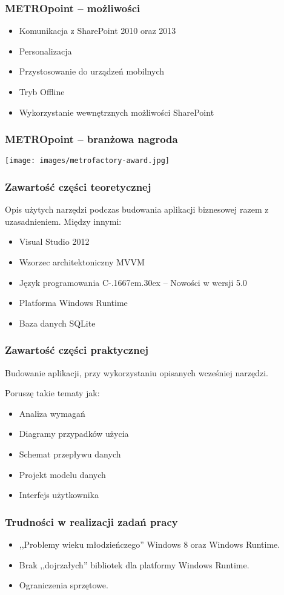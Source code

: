 \documentclass{beamer}
\def\Csharp{%
    C\kern-.1667em\raise.30ex\hbox{\smaller{\#}}%
 }
\begin{document}
\begin{frame}
\frametitle{\textbf{METRO}point -- możliwości}
\begin{itemize}[<+->]
\item Komunikacja z SharePoint 2010 oraz 2013
\item Personalizacja
\item Przystosowanie do urządzeń mobilnych 
\item Tryb Offline
\item Wykorzystanie wewnętrznych możliwości SharePoint
\end{itemize}
\end{frame}


\begin{frame}
\frametitle{\textbf{METRO}point -- branżowa nagroda}
 \texttt{[image: images/metrofactory-award.jpg]}
\end{frame}

\begin{frame}
\frametitle{Zawartość części teoretycznej}
Opis użytych narzędzi podczas budowania aplikacji biznesowej razem z uzasadnieniem.
Między innymi:
\begin{itemize}[<+->]
\item Visual Studio 2012
\item Wzorzec architektoniczny MVVM
\item Język programowania \Csharp -- Nowości w wersji 5.0
\item Platforma Windows Runtime
\item Baza danych SQLite
\end{itemize}
\end{frame}

\begin{frame}
\frametitle{Zawartość części praktycznej}
Budowanie aplikacji, przy wykorzystaniu opisanych wcześniej narzędzi.

Poruszę takie tematy jak:
\begin{itemize}[<+->]
\item Analiza wymagań
\item Diagramy przypadków użycia
\item Schemat przepływu danych
\item Projekt modelu danych
\item Interfejs użytkownika
\end{itemize}
\end{frame}

\begin{frame}
\frametitle{Trudności w realizacji zadań pracy}

\begin{itemize}[<+->]
\item ,,Problemy wieku młodzieńczego'' Windows 8 oraz Windows Runtime.
\item Brak ,,dojrzałych'' bibliotek dla platformy Windows Runtime.
\item Ograniczenia sprzętowe.

\end{itemize}
\end{frame}
\end{document}
